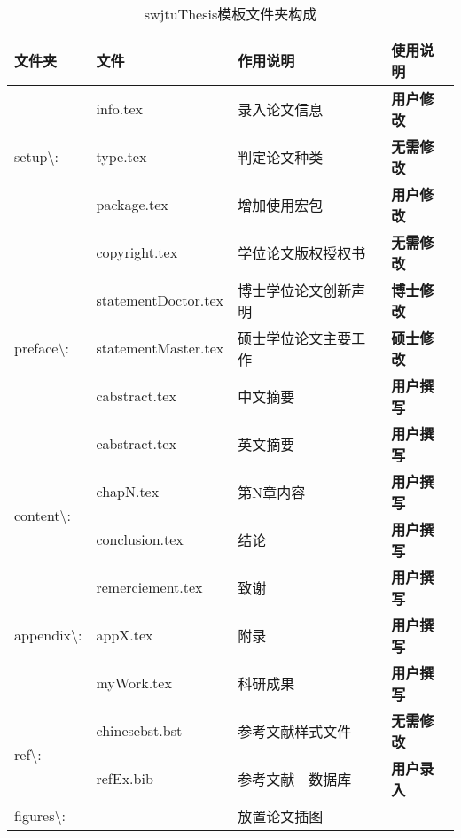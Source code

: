 \begin{table}[htbp]
	\setlength{\abovecaptionskip}{0pt}
	\setlength{\belowcaptionskip}{0pt}\
	\caption{swjtuThesis模板文件夹构成}
	\label{tab_1_1_files}
	\centering
	\begin{tabular}{llll}
		\toprule
		文件夹 & 文件 & 作用说明 & 使用说明 \\
		\midrule
		\multirow{3}{*}{\centering setup\textbackslash{}:} & info.tex & 录入论文信息 & \textbf{用户修改} \\
		& type.tex & 判定论文种类 & \textbf{无需修改} \\
	    & package.tex & 增加使用宏包 & \textbf{用户修改} \\
	    \midrule
	    \multirow{5}{*}{\centering preface\textbackslash{}:} & copyright.tex & 学位论文版权授权书 & \textbf{无需修改} \\
	    & statementDoctor.tex & 博士学位论文创新声明 & \textbf{博士修改} \\
	    & statementMaster.tex & 硕士学位论文主要工作 & \textbf{硕士修改} \\
	    & cabstract.tex & 中文摘要 & \textbf{用户撰写} \\
	    & eabstract.tex & 英文摘要 & \textbf{用户撰写} \\
	    \midrule
	    \multirow{2}{*}{\centering content\textbackslash{}:} & chapN.tex & 第N章内容 & \textbf{用户撰写} \\
	    & conclusion.tex & 结论 & \textbf{用户撰写} \\
	    \midrule
	    \multirow{3}{*}{\centering appendix\textbackslash{}:} & remerciement.tex & 致谢 & \textbf{用户撰写} \\
	    & appX.tex & 附录 & \textbf{用户撰写} \\
	    & myWork.tex & 科研成果 & \textbf{用户撰写} \\
	    \midrule
	    \multirow{2}{*}{\centering ref\textbackslash{}:} & chinesebst.bst & 参考文献样式文件 & \textbf{无需修改} \\
	    & refEx.bib & 参考文献~\BibTeX~数据库 & \textbf{用户录入}\\
	    \midrule
	    figures\textbackslash{}: &  & 放置论文插图 \\
		\bottomrule
	\end{tabular}
\end{table}




